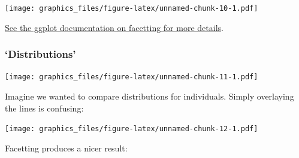 \documentclass[]{article}
\newenvironment{Shaded}{\begin{snugshade}}{\end{snugshade}}
\newcommand{\KeywordTok}[1]{\textcolor[rgb]{0.13,0.29,0.53}{\textbf{#1}}}
\newcommand{\DataTypeTok}[1]{\textcolor[rgb]{0.13,0.29,0.53}{#1}}
\newcommand{\StringTok}[1]{\textcolor[rgb]{0.31,0.60,0.02}{#1}}
\newcommand{\OperatorTok}[1]{\textcolor[rgb]{0.81,0.36,0.00}{\textbf{#1}}}
\newcommand{\NormalTok}[1]{#1}
\theoremstyle{definition}
\theoremstyle{definition}
\theoremstyle{definition}
\theoremstyle{remark}
\begin{document}
\texttt{[image: graphics\_files/figure-latex/unnamed-chunk-10-1.pdf]}

\href{http://ggplot2.tidyverse.org/reference/\#section-facetting}{See
the ggplot documentation on facetting for more details}.

\subsubsection*{\texorpdfstring{`Distributions'}{Distributions}}\label{distributions}

\begin{Shaded}
\end{Shaded}

\texttt{[image: graphics\_files/figure-latex/unnamed-chunk-11-1.pdf]}

Imagine we wanted to compare distributions for individuals. Simply
overlaying the lines is confusing:

\begin{Shaded}
\end{Shaded}

\texttt{[image: graphics\_files/figure-latex/unnamed-chunk-12-1.pdf]}

Facetting produces a nicer result:

\begin{Shaded}
\end{Shaded}
\end{document}
